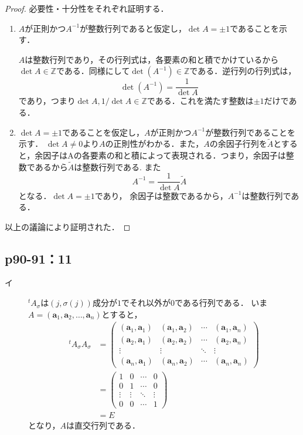 \documentclass[uplatex,dvipdfmx,a4paper,10pt,fleqn]{jsarticle}
\begin{document}
\begin{leftbar}
\begin{proof}
必要性・十分性をそれぞれ証明する．
\begin{enumerate}
\item $A$が正則かつ$A^{-1}$が整数行列であると仮定し，$\det A=\pm 1$であることを示す．

$A$は整数行列であり，その行列式は，各要素の和と積でかけているから$\det A \in \mathbb{Z}$である．同様にして$\det (A^{-1}) \in \mathbb{Z}$である．逆行列の行列式は，
\[
\det (A^{-1})=\frac{1}{\det A}
\]
であり，つまり$\det A,1/\det A \in \mathbb{Z}$である．これを満たす整数は$\pm 1$だけである．
\item $\det A=\pm 1$であることを仮定し，$A$が正則かつ$A^{-1}$が整数行列であることを示す．
$\det A \neq 0$より$A$の正則性がわかる．また，$A$の余因子行列を$\tilde{A}$とすると，余因子はAの各要素の和と積によって表現される．つまり，余因子は整数であるから$\tilde{A}$は整数行列である. また
\[
A^{-1}=\frac{1}{\det A}\tilde{A}
\]
となる．$\det A=\pm 1$であり， 余因子は整数であるから，$A^{-1}$は整数行列である．
\end{enumerate}
以上の議論により証明された．
\end{proof}
\end{leftbar}

\newpage 

\subsection*{p90-91：11}
\begin{tleftbar}
    \begin{description}
        \item[イ] ${}^t A_\sigma$は$(j,\sigma(j))$成分が$1$でそれ以外が$0$である行列である．
        いま$A = (\bm{a}_1,\bm{a}_2,\ldots,\bm{a}_n)$とすると，
        \begin{align*}
            {}^t A_\sigma A_\sigma &= 
            \begin{pmatrix} 
                (\bm{a}_1,\bm{a}_1) & (\bm{a}_1,\bm{a}_2) & \cdots & (\bm{a}_1,\bm{a}_n) \\ 
                (\bm{a}_2,\bm{a}_1) & (\bm{a}_2,\bm{a}_2) & \cdots & (\bm{a}_2,\bm{a}_n) \\
                \vdots & \vdots & \ddots & \vdots \\
                (\bm{a}_n,\bm{a}_1) & (\bm{a}_n,\bm{a}_2) & \cdots & (\bm{a}_n,\bm{a}_n)
            \end{pmatrix}
            \\
            & = \begin{pmatrix} 1 & 0 & \cdots & 0 \\ 0 & 1 & \cdots & 0 \\ \vdots & \vdots & \ddots & \vdots \\ 0 & 0 & \cdots & 1 \end{pmatrix} \\
            &= E
        \end{align*}
        となり，$A$は直交行列である．
    \end{description}
\end{tleftbar}
\end{document}

